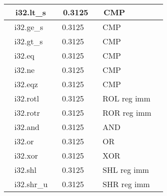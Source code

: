 \documentclass{article}
\begin{document}
\begin{table}
\begin{tabular}{|l|l|l|l|}
\hline
~ i32.lt\_s                                 & ~ 0.3125                     & ~ CMP                                                &                       \\
\hline
~ i32.ge\_s                                 & ~ 0.3125                     & ~ CMP                                                &                       \\
\hline
~ i32.gt\_s                                 & ~ 0.3125                     & ~ CMP                                                &                       \\
\hline
~ i32.eq                                    & ~ 0.3125                     & ~ CMP                                                &                       \\
\hline
~ i32.ne                                    & ~ 0.3125                     & ~ CMP                                                &                       \\
\hline
~ i32.eqz                                   & ~ 0.3125                     & ~ CMP                                                &                       \\
\hline
~ i32.rotl                                  & ~ 0.3125                     & ~ ROL reg imm                                        &                       \\
\hline
~ i32.rotr                                  & ~ 0.3125                     & ~ ROR reg imm                                        &                       \\
\hline
~ i32.and                                   & ~ 0.3125                     & ~ AND                                                &                       \\
\hline
~ i32.or                                    & ~ 0.3125                     & ~ OR                                                 &                       \\
\hline
~ i32.xor                                   & ~ 0.3125                     & ~ XOR                                                &                       \\
\hline
~ i32.shl                                   & ~ 0.3125                     & ~ SHL reg imm                                        &                       \\
\hline
~ i32.shr\_u                                & ~ 0.3125                     & ~ SHR reg imm                                        &                       \\

\end{tabular}
\end{table}
\end{document}
